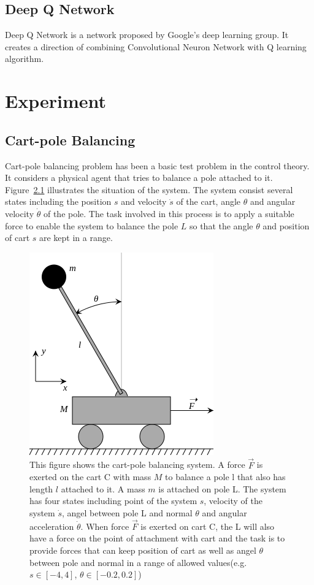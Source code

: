 \documentclass[officiallayout]{tktla}
\begin{document}
\section{Deep Q Network}
Deep Q Network is a network proposed by Google's deep learning group. It creates a direction of combining Convolutional Neuron Network with Q learning algorithm\cite{mnih2013playing}\cite{mnih2015human}. 




\chapter{Experiment}

\section{Cart-pole Balancing}
Cart-pole balancing problem has been a basic test problem in the control theory. It considers a physical agent that tries to balance a pole attached to it. Figure~\ref{cart_pendulum} illustrates the situation of the system. The system consist several states including the position $s$ and velocity $\dot{s}$ of the cart, angle $\theta$ and angular velocity $\dot{\theta}$ of the pole. The task involved in this process is to apply a suitable force to enable the system to balance the pole $L$ so that the angle $\theta$ and position of cart $s$ are kept in a range.
\begin{figure}[ht]
\centering
\includegraphics[scale=0.5]{cart_pendulum}
\caption{This figure shows the cart-pole balancing system. A force $\vec{F}$ is exerted on the cart C with mass $M$ to balance a pole l that also has length $l$ attached to it. A mass $m$ is attached on pole L. The system has four states including point of the system $s$, velocity of the system $\dot{s}$, angel between pole L and normal $\theta$ and angular acceleration $ \dot{\theta}$. When force $\vec{F}$ is exerted on cart C, the L will also have a force on the point of attachment with cart and the task is to provide forces that can keep position of cart as well as angel $\theta$ between pole and normal in a range of allowed values(e.g. $s \in [-4,4]$, $\theta \in [-0.2, 0.2]$)}
\label{cart_pendulum}
\end{figure}
\end{document}
